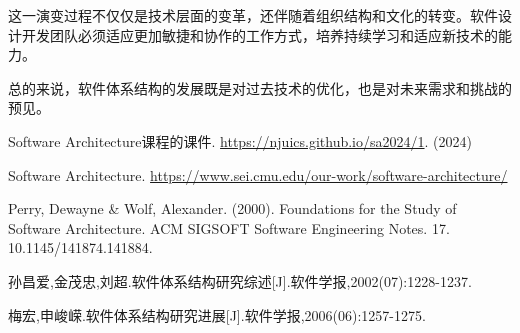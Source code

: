 \documentclass{SCIS2023cn}
\begin{document}
这一演变过程不仅仅是技术层面的变革，还伴随着组织结构和文化的转变。软件设计开发团队必须适应更加敏捷和协作的工作方式，培养持续学习和适应新技术的能力。

总的来说，软件体系结构的发展既是对过去技术的优化，也是对未来需求和挑战的预见。

\vfill

\begin{thebibliography}{99}
	
 Software Architecture课程的课件. \url{https://njuics.github.io/sa2024/1}. (2024)

 Software Architecture. \url{https://www.sei.cmu.edu/our-work/software-architecture/}

 Perry, Dewayne \& Wolf, Alexander. (2000). Foundations for the Study of Software Architecture. ACM SIGSOFT Software Engineering Notes. 17. 10.1145/141874.141884. 

 孙昌爱,金茂忠,刘超.软件体系结构研究综述[J].软件学报,2002(07):1228-1237.

 梅宏,申峻嵘.软件体系结构研究进展[J].软件学报,2006(06):1257-1275.

\end{thebibliography}

\newpage

\makeentitle
\end{document}
